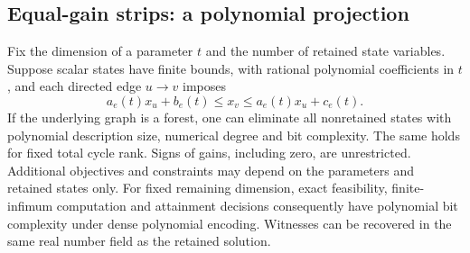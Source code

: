 \subsection{Equal-gain strips: a polynomial projection}
\label{app:strip-projection}
\begin{proposition}
\label{prop:strip-projection}
Fix the dimension of a parameter \(t\) and the number of retained state
variables. Suppose scalar states have finite bounds, with rational polynomial
coefficients in \(t\), and each directed edge \(u\to v\) imposes
\begin{equation}\label{eq:affine-strip}
 a_e(t)x_u+b_e(t)\le x_v\le a_e(t)x_u+c_e(t).
\end{equation}
If the underlying graph is a forest, one can eliminate all nonretained states
with polynomial description size, numerical degree and bit complexity.
The same holds for fixed total cycle rank. Signs of gains, including zero,
are unrestricted. Additional objectives and constraints may depend on the
parameters and retained states only. For fixed remaining dimension, exact
feasibility, finite-infimum computation and attainment decisions consequently
have polynomial bit complexity under dense polynomial encoding. Witnesses
can be recovered in the same real number field as the retained solution.
\end{proposition}
